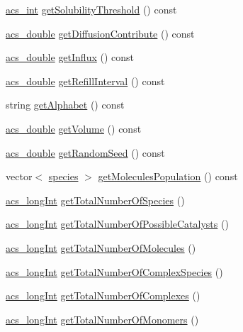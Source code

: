 \begin{DoxyCompactItemize}
\hyperlink{a00050_a8d277355641a098190360234e2ebde35}{acs\-\_\-int} \hyperlink{a00014_a6df38337d38f2f714be7058a2a31202c}{get\-Solubility\-Threshold} () const 
\item 
\hyperlink{a00050_ab776853a005fcbf56af0424a2a4dd607}{acs\-\_\-double} \hyperlink{a00014_a46193e153bd5dcc37fb35346cb7fd971}{get\-Diffusion\-Contribute} () const 
\item 
\hyperlink{a00050_ab776853a005fcbf56af0424a2a4dd607}{acs\-\_\-double} \hyperlink{a00014_a6f0b4481779cd12dbcd8155916c7d703}{get\-Influx} () const 
\item 
\hyperlink{a00050_ab776853a005fcbf56af0424a2a4dd607}{acs\-\_\-double} \hyperlink{a00014_a469a7ce80a1e9e5fae77b46b66dfee18}{get\-Refill\-Interval} () const 
\item 
string \hyperlink{a00014_add8478cfc878c3aa5a57b2a71357a088}{get\-Alphabet} () const 
\item 
\hyperlink{a00050_ab776853a005fcbf56af0424a2a4dd607}{acs\-\_\-double} \hyperlink{a00014_a355b53cbc86aaab2a6d114980162ac0e}{get\-Volume} () const 
\item 
\hyperlink{a00050_ab776853a005fcbf56af0424a2a4dd607}{acs\-\_\-double} \hyperlink{a00014_ab6952f7f6fd971ece0a8661733cfc2b3}{get\-Random\-Seed} () const 
\item 
vector$<$ \hyperlink{a00022}{species} $>$ \hyperlink{a00014_adb12eb52af74ea1fdfe0cd195109fe83}{get\-Molecules\-Population} () const 
\item 
\hyperlink{a00050_a19319d75f02db4308bc5c0026d98cd85}{acs\-\_\-long\-Int} \hyperlink{a00014_a7a321296874fa1320da225cdbbf56a64}{get\-Total\-Number\-Of\-Species} ()
\item 
\hyperlink{a00050_a19319d75f02db4308bc5c0026d98cd85}{acs\-\_\-long\-Int} \hyperlink{a00014_a8796aead7bcc4a3f91eec7bc908dfa5b}{get\-Total\-Number\-Of\-Possible\-Catalysts} ()
\item 
\hyperlink{a00050_a19319d75f02db4308bc5c0026d98cd85}{acs\-\_\-long\-Int} \hyperlink{a00014_a57e7ac49955f4717096cb6696ee03a61}{get\-Total\-Number\-Of\-Molecules} ()
\item 
\hyperlink{a00050_a19319d75f02db4308bc5c0026d98cd85}{acs\-\_\-long\-Int} \hyperlink{a00014_a453d88017912e8b5973310ea2b044266}{get\-Total\-Number\-Of\-Complex\-Species} ()
\item 
\hyperlink{a00050_a19319d75f02db4308bc5c0026d98cd85}{acs\-\_\-long\-Int} \hyperlink{a00014_ab564c7ddffd3dba896d5b049e1257793}{get\-Total\-Number\-Of\-Complexes} ()
\item 
\hyperlink{a00050_a19319d75f02db4308bc5c0026d98cd85}{acs\-\_\-long\-Int} \hyperlink{a00014_aa8c94019533639038f99587fc2b029dc}{get\-Total\-Number\-Of\-Monomers} ()

\end{DoxyCompactItemize}
